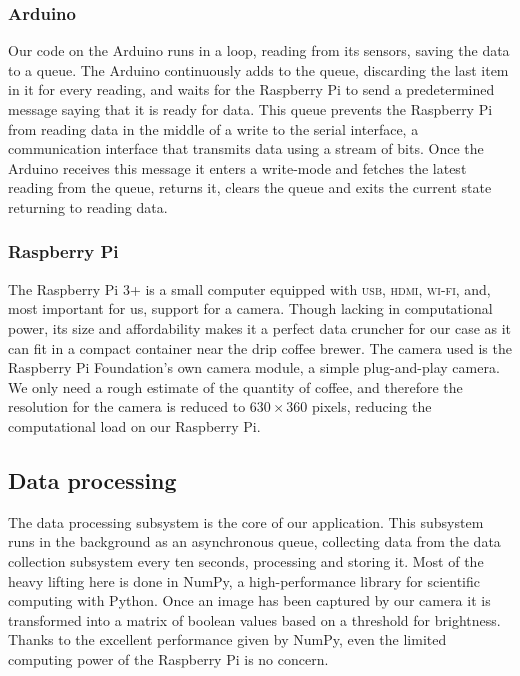 \documentclass[12pt,a4paper,oneside,article]{memoir}
\numberwithin{equation}{chapter}
\begin{document}
\subsubsection{Arduino}\label{sec:arduino}
Our code on the Arduino runs in a loop, reading from its sensors, saving the
data to a queue. The Arduino continuously adds to the queue, discarding the last
item in it for every reading, and waits for the Raspberry Pi to send a
predetermined message saying that it is ready for data. This queue prevents the
Raspberry Pi from reading data in the middle of a write to the serial interface,
a communication interface that transmits data using a stream of bits. Once the
Arduino receives this message it enters a write-mode and fetches the latest
reading from the queue, returns it, clears the queue and exits the current state
returning to reading data.

\subsubsection{Raspberry Pi}\label{sec:raspberry-pi}
The Raspberry Pi 3+ is a small computer equipped with \textsc{usb},
\textsc{hdmi}, \textsc{wi-fi}, and, most important for us, support for a camera.
Though lacking in computational power, its size and affordability makes it a
perfect data cruncher for our case as it can fit in a compact container near the
drip coffee brewer. The camera used is the Raspberry Pi Foundation's own camera
module, a simple plug-and-play camera. We only need a rough estimate of the
quantity of coffee, and therefore the resolution for the camera is reduced to
\(630 \times 360\) pixels, reducing the computational load on our Raspberry Pi.

\subsection{Data processing}\label{sec:data-processing}
The data processing subsystem is the core of our application. This subsystem
runs in the background as an asynchronous queue, collecting data from the data
collection subsystem every ten seconds, processing and storing it. Most of the
heavy lifting here is done in NumPy, a high-performance library for scientific
computing with Python. Once an image has been captured by our camera it is
transformed into a matrix of boolean values based on a threshold for brightness.
Thanks to the excellent performance given by NumPy, even the limited computing
power of the Raspberry Pi is no concern.
\end{document}
